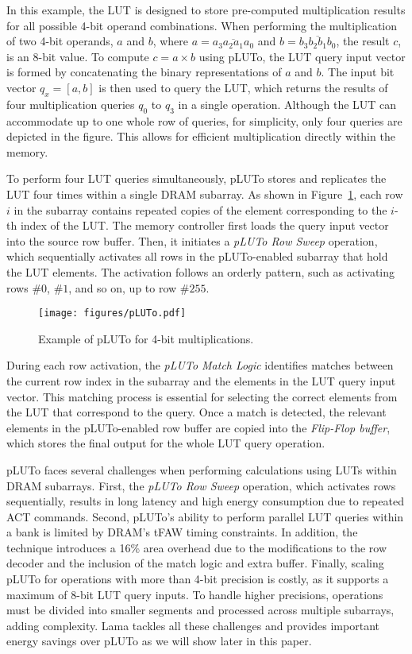 In this example, the LUT is designed to store pre-computed multiplication results for all possible 4-bit operand combinations. When performing the multiplication of two 4-bit operands, $a$ and $b$, where $a = \overline{a_{3}a_{2}a_{1}a_{0}}$ and $b = \overline{b_{3}b_{2}b_{1}b_{0}}$, the result $c$, is an 8-bit value. To compute $c = a\times b$ using pLUTo, the LUT query input vector is formed by concatenating the binary representations of $a$ and $b$. The input bit vector $q_{x}=[a,b]$ is then used to query the LUT, which returns the results of four multiplication queries $q_{0}$ to $q_{3}$ in a single operation. Although the LUT can accommodate up to one whole row of queries, for simplicity, only four queries are depicted in the figure. This allows for efficient multiplication directly within the memory.

To perform four LUT queries simultaneously, pLUTo stores and replicates the LUT four times within a single DRAM subarray. As shown in Figure~\ref{fig:pLUTo}, each row $i$ in the subarray contains repeated copies of the element corresponding to the $i$-th index of the LUT. The memory controller first loads the query input vector into the source row buffer. Then, it initiates a \textit{pLUTo Row Sweep} operation, which sequentially activates all rows in the pLUTo-enabled subarray that hold the LUT elements. The activation follows an orderly pattern, such as activating rows $\#0$, $\#1$, and so on, up to row $\#255$.

\begin{figure}[t!]
\centering
\texttt{[image: figures/pLUTo.pdf]}
\caption{Example of pLUTo for 4-bit multiplications.}
\label{fig:pLUTo}
\vskip -0.15in
\end{figure}

During each row activation, the \textit{pLUTo Match Logic} identifies matches between the current row index in the subarray and the elements in the LUT query input vector. This matching process is essential for selecting the correct elements from the LUT that correspond to the query. Once a match is detected, the relevant elements in the pLUTo-enabled row buffer are copied into the \textit{Flip-Flop buffer}, which stores the final output for the whole LUT query operation.

pLUTo faces several challenges when performing calculations using LUTs within DRAM subarrays. First, the \textit{pLUTo Row Sweep} operation, which activates rows sequentially, results in long latency and high energy consumption due to repeated ACT commands. Second, pLUTo's ability to perform parallel LUT queries within a bank is limited by DRAM’s tFAW timing constraints. In addition, the technique introduces a 16\% area overhead due to the modifications to the row decoder and the inclusion of the match logic and extra buffer. Finally, scaling pLUTo for operations with more than 4-bit precision is costly, as it supports a maximum of 8-bit LUT query inputs. To handle higher precisions, operations must be divided into smaller segments and processed across multiple subarrays, adding complexity. Lama tackles all these challenges and provides important energy savings over pLUTo as we will show later in this paper.
